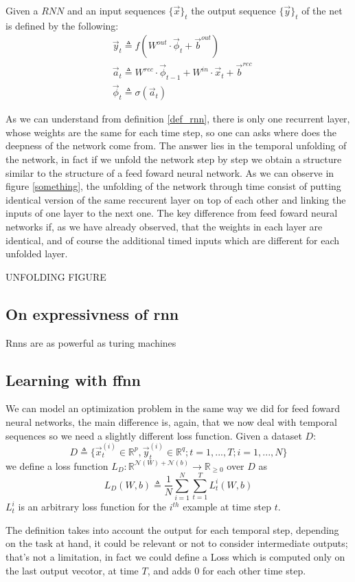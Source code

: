 Given a $RNN$ and an input sequences $\{\vec{x}\}_t$ the output sequence $\{\vec{y}\}_t$ of the net is defined by the following:
\begin{align}
&\vec{y}_t \triangleq f(W^{out}\cdot\vec{\phi}_t + \vec{b}^{out})\\
&\vec{a}_t \triangleq W^{rec}\cdot\vec{\phi}_{t-1}+W^{in}\cdot\vec{x}_t+\vec{b}^{rec}\\
&\vec{\phi}_t \triangleq  \sigma(\vec{a}_t)
\end{align}

As we can understand from definition \ref{def_rnn}, there is only one recurrent layer, whose weights are the same for each time step, so one can asks where does the deepness of the network come from.
The answer lies in the temporal unfolding of the network, in fact if we unfold the network step by step we obtain a structure similar to the structure of a feed foward neural network. As we can observe
in figure \ref{something}, the unfolding of the network through time consist of putting identical version of the same reccurent layer on top of each other and linking the inputs of one layer to the
next one. The key difference from feed foward neural networks if, as we have already observed, that the weights in each layer are identical, and of course the additional timed inputs which are different for
each unfolded layer.

UNFOLDING FIGURE

\subsection{On expressivness of rnn}
Rnns are as powerful as turing machines
\subsection{Learning with ffnn}
We can model an optimization problem in the same way we did for feed foward neural networks, the main difference is, again, that we now deal with temporal sequences so we need a slightly different
loss function.
Given a dataset $D$:
\begin{equation}
D\triangleq\{\vec{x}_t^{(i)} \in \mathbb{R}^p, \vec{y}_t^{(i)} \in \mathbb{R}^q; t=1,...,T;  i=1,...,N\}
\end{equation}
we define a loss function $L_D:\mathbb{R}^{\mathcal{N}(W)+\mathcal{N}(b)} \rightarrow \mathbb{R}_{\geq 0}$ over $D$  as
\begin{equation}
L_D(W,b)\triangleq\frac{1}{N}\sum_{i=1}^N \sum_{t=1}^T L_t^i(W,b) 
\end{equation}
$L_t^i$ is an arbitrary loss function for the $i^{th}$ example at time step $t$.

The definition takes into account the output for each temporal step, depending on the task at hand, it could be relevant or not to consider intermediate
outputs; that's not a limitation, in fact we could define a Loss which is computed only on the last output vecotor, at time $T$, and adds 0 for each
other time step.



